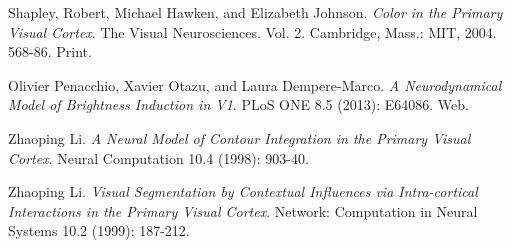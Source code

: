 \documentclass[journal,onecolumn]{IEEEtran}
\begin{document}
\ifCLASSOPTIONcaptionsoff
  \newpage
\fi





%
%
%
\begin{thebibliography}{1}

  Shapley, Robert, Michael Hawken, and Elizabeth Johnson.
  \emph{Color in the Primary Visual Cortex}.
  The Visual Neurosciences. Vol. 2.
  Cambridge, Mass.: MIT, 2004.
  568-86.
  Print.

  Olivier Penacchio, Xavier Otazu, and Laura Dempere-Marco.
  \emph{A Neurodynamical Model of Brightness Induction in V1}.
  PLoS ONE 8.5 (2013): E64086.
  Web.

  Zhaoping Li.
  \emph{A Neural Model of Contour Integration in the Primary Visual Cortex}.
  Neural Computation 10.4 (1998): 903-40.

  Zhaoping Li.
  \emph{Visual Segmentation by Contextual Influences via Intra-cortical Interactions in the Primary Visual Cortex}.
  Network: Computation in Neural Systems 10.2 (1999): 187-212.

    
\end{thebibliography}

% 
\end{document}
